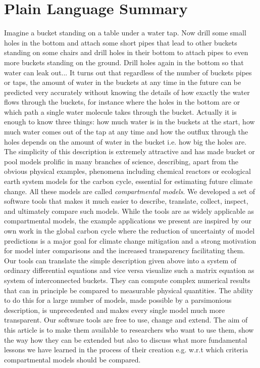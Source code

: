 \section*{Plain Language Summary} 
Imagine a bucket standing on a table under a water tap. Now drill some small
holes in the bottom and attach some short pipes that lead to other buckets
standing on some chairs and drill holes in their bottom to attach pipes to even
more buckets standing on the ground. Drill holes again in the bottom so that
water can leak out...  It turns out that regardless of the number of buckets
pipes or taps, the amount of water in the buckets at any time in the future can
be predicted very accurately without knowing the details of how exactly the
water flows through the buckets, for instance where the holes in the bottom are
or which path a single water molecule takes through the bucket.  Actually it is
enough to know three things: how much water is in the buckets at the start, how
much water comes out of the tap at any time and how the outflux through the
holes depends on the amount of water in the bucket i.e. how big the holes are.
The simplicity of this description is extremely attractive and has made bucket
or pool models prolific in many branches of science, describing, apart from the
obvious physical examples, phenomena including  chemical reactors or
ecological earth system models for the carbon cycle, essential for estimating
future climate change.  All these models are called \emph{compartmental
models}.  We developed a set of software tools that makes it much easier to
describe, translate, collect, inspect, and ultimately compare such models.
While the tools are as widely applicable as compartmental models, the example
applications we present are inspired by our own work in the global carbon cycle
where the reduction of uncertainty of model predictions is a major goal for
climate change mitigation and a strong motivation for model inter comparisons
and the increased transparency facilitating them.  Our tools can translate the
simple description given above into a system of ordinary differential equations
and vice versa visualize such a matrix  equation as system of interconnected
buckets. They can compute complex numerical results that can in principle
be compared to measurable physical quantities.  The ability to do this for a
large number of models, made possible by a parsimonious description, is
unprecedented and makes every single model much more transparent.  Our software
tools are free to use, change and extend.  The aim of this article is to make
them available to researchers who want to use them, show the way how they can
be extended but also to discuss what more fundamental lessons we have learned
in the process of their creation e.g. w.r.t which criteria compartmental models
should be compared.
%
%

